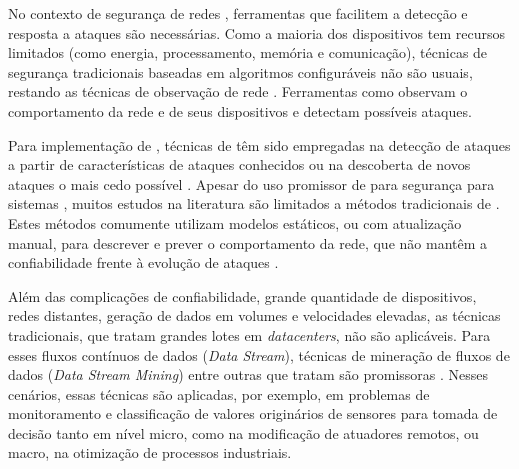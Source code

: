 No contexto de segurança de redes \iot, ferramentas que facilitem a detecção e
resposta a ataques são necessárias.
Como a maioria dos dispositivos \iot tem recursos limitados (como energia,
processamento, memória e comunicação), técnicas de segurança tradicionais
baseadas em algoritmos configuráveis não são usuais, restando as
técnicas de observação de rede \cite{Zhou2017}.
Ferramentas como \nids observam o comportamento da rede e de seus dispositivos
e detectam possíveis ataques.
% 

Para implementação de \nids, técnicas de \ml têm sido empregadas na detecção de
ataques a partir de características de ataques conhecidos ou na
descoberta de novos ataques o mais cedo possível
\cite{buczak2016survey,mitchell2014survey}.
Apesar do uso promissor de \ml para segurança para sistemas \iot, muitos estudos
na literatura \cite{buczak2016survey,mitchell2014survey,Tahsien2020} são
limitados a métodos tradicionais de \ml.
Estes métodos comumente utilizam modelos estáticos, ou com atualização manual,
para descrever e prever o comportamento da rede, que não mantêm a confiabilidade
frente à evolução de ataques \cite{Viegas2019,AndreoniLopez2019}.

Além das complicações de confiabilidade, grande quantidade de dispositivos,
redes distantes, geração de dados em volumes e velocidades elevadas, as técnicas
tradicionais, que tratam grandes lotes em \emph{datacenters}, não são aplicáveis.
Para esses fluxos contínuos de dados (\emph{Data Stream}), técnicas de
mineração de fluxos de dados (\emph{Data Stream Mining}) entre outras que tratam
são promissoras \cite{AriyaluranHabeeb2019,Faria2016ndds,Akbar2017}.
% 
Nesses cenários, essas técnicas são aplicadas, por exemplo, em problemas de
monitoramento e classificação de valores originários de sensores para tomada de
decisão tanto em nível micro, como na modificação de atuadores remotos, ou
macro, na otimização de processos industriais.
% 

